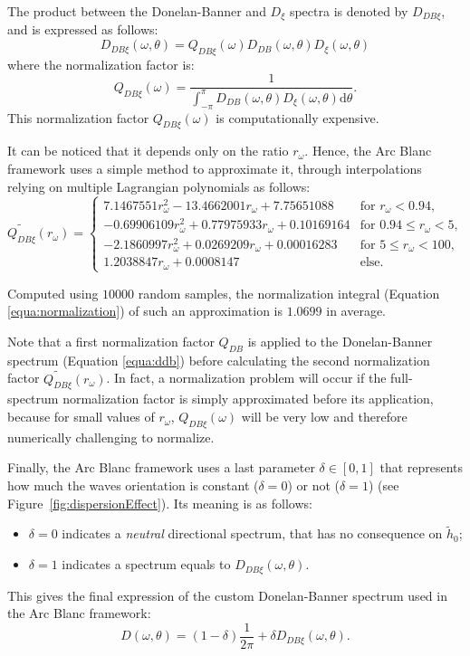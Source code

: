 \documentclass[11pt]{article}
\def\framework{the Arc Blanc framework\xspace}
\begin{document}
The product between the Donelan-Banner and $D_{\xi}$ spectra is denoted by $D_{DB\xi}$, and is expressed as follows:
\begin{equation}
	D_{DB\xi}(\omega, \theta) =Q_{DB\xi}(\omega) D_{DB}(\omega, \theta) D_{\xi}(\omega, \theta)
\end{equation}
where the normalization factor is:
\begin{equation}
	Q_{DB\xi}(\omega)=\frac{1}{\displaystyle\int_{-\pi}^\pi D_{DB}(\omega, \theta) D_{\xi}(\omega, \theta) \mathrm{d} \theta}.
\end{equation}
This normalization factor $Q_{DB\xi}(\omega)$ is computationally expensive.

It can be noticed that it depends only on the ratio $r_{\omega}$.
Hence, \framework uses a simple method to approximate it, through interpolations relying on multiple Lagrangian polynomials as follows:
\begin{equation}
	\widetilde{Q_{DB\xi}}(r_{\omega})=
	\begin{cases}
		7.1467551 r_{\omega}^2 - 13.4662001 r_{\omega} + 7.75651088    & \text{for }r_{\omega} < 0.94,        \\
		- 0.69906109 r_{\omega}^2 + 0.77975933 r_{\omega} + 0.10169164 & \text{for }0.94 \leq r_{\omega} < 5, \\
		- 2.1860997 r_{\omega}^2 +0.0269209 r_{\omega} +0.00016283     & \text{for } 5 \leq r_{\omega} < 100, \\
		1.2038847 r_{\omega} + 0.0008147                               & \text{else.}
	\end{cases}
\end{equation}

Computed using $10000$ random samples, the normalization integral (Equation \ref{equa:normalization}) of such an approximation is $1.0699$ in average.

Note that a first normalization factor $Q_{DB}$ is applied to the Donelan-Banner spectrum (Equation \ref{equa:ddb}) before calculating the second normalization factor $\widetilde{Q_{DB\xi}}(r_{\omega})$. In fact, a normalization problem will occur if the full-spectrum normalization factor is simply approximated before its application, because for small values of $r_{\omega}$, $Q_{DB\xi}(\omega)$ will be very low and therefore numerically challenging to normalize.

Finally, \framework uses a last parameter $\delta\in[0,1]$ that represents how much the waves orientation is constant ($\delta = 0$) or not ($\delta = 1$) (see Figure~\ref{fig:dispersionEffect}).
Its meaning is as follows:
\begin{itemize}
	\item $\delta = 0$ indicates a \emph{neutral} directional spectrum, that has no consequence on $\tilde{h}_0$;
	\item $\delta=1$ indicates a spectrum equals to $D_{DB\xi}(\omega, \theta)$.
\end{itemize}
This gives the final expression of the custom Donelan-Banner spectrum used in \framework:
\begin{equation}
	D(\omega, \theta)=\left(1-\delta\right)\frac{1}{2\pi}+\delta D_{DB\xi}(\omega,\theta).
\end{equation}
\end{document}
